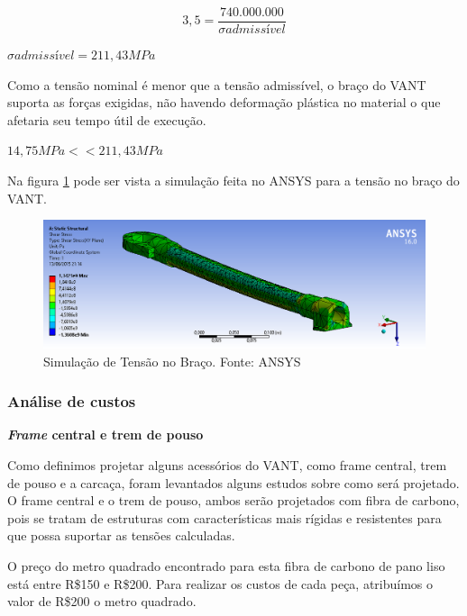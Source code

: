 \begin{equation}
 3,5= \frac{740.000.000}{\sigma admissível}
\end{equation}

\begin{center}
 $\sigma admissível = 211,43 MPa$
\end{center}

Como a tensão nominal é menor que a tensão admissível, o braço do VANT suporta as forças exigidas, não havendo deformação plástica no material o que afetaria seu tempo útil de execução.
\begin{center}
$14,75 MPa <<  211,43 MPa$
\end{center}

Na figura \ref{fig:simulacao} pode ser vista a simulação feita no ANSYS para a tensão no braço do VANT.

\begin{figure}[H]
    \centering
      \includegraphics[keepaspectratio=true,scale=0.4]{figuras/simulacao_ansys.png}
    \caption{Simulação de Tensão no Braço. Fonte: ANSYS}
    \label{fig:simulacao}
\end{figure}

\subsubsection{Análise de custos}

\indent \textbf{\textit{Frame} central e trem de pouso}

Como definimos projetar alguns acessórios do VANT, como frame central, trem de pouso e a carcaça, foram levantados alguns estudos sobre como será projetado. O frame central e o trem de pouso, ambos serão projetados com fibra de carbono, pois se tratam de estruturas com características mais rígidas e resistentes para que possa suportar as tensões calculadas.

O preço do metro quadrado encontrado para esta fibra de carbono de pano liso está entre R\$150 e R\$200. Para realizar os custos de cada peça, atribuímos o valor de R\$200 o metro quadrado.

